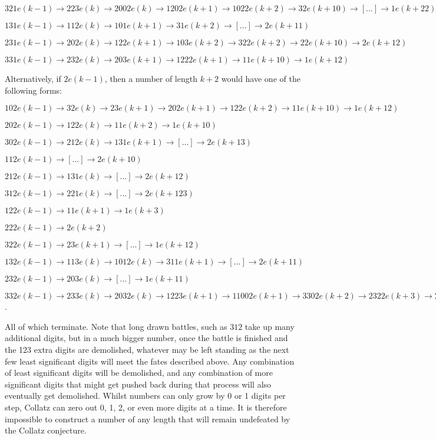 \documentclass{proc-l}
\theoremstyle{definition}
\theoremstyle{remark}
\numberwithin{equation}{section}
\begin{document}
$321e(k-1) \rightarrow 223e(k) \rightarrow 2002e(k) \rightarrow 1202e(k+1) \rightarrow 1022e(k+2) \rightarrow 32e(k+10) \rightarrow [...] \rightarrow 1e(k+22)$

$131e(k-1) \rightarrow 112e(k) \rightarrow 101e(k+1) \rightarrow 31e(k+2) \rightarrow [...] \rightarrow 2e(k+11) $

$231e(k-1) \rightarrow 202e(k) \rightarrow 122e(k+1) \rightarrow 103e(k+2) \rightarrow 322e(k+2) \rightarrow 22e(k+10) \rightarrow 2e(k+12)$

$331e(k-1) \rightarrow 232e(k) \rightarrow 203e(k+1) \rightarrow 1222e(k+1) \rightarrow 11e(k+10) \rightarrow 1e(k+12)$


Alternatively, if $2e(k-1)$, then a number of length $k+2$ would have one of the following forms:

$102e(k-1) \rightarrow 32e(k) \rightarrow 23e(k+1) \rightarrow 202e(k+1) \rightarrow 122e(k+2) \rightarrow 11e(k+10) \rightarrow 1e(k+12)$

$202e(k-1) \rightarrow 122e(k) \rightarrow 11e(k+2) \rightarrow 1e(k+10)$

$302e(k-1) \rightarrow 212e(k) \rightarrow 131e(k+1) \rightarrow [...] \rightarrow 2e(k+13)$

$112e(k-1) \rightarrow [...] \rightarrow 2e(k+10)$

$212e(k-1) \rightarrow 131e(k) \rightarrow [...] \rightarrow 2e(k+12)$

$312e(k-1) \rightarrow 221e(k) \rightarrow [...] \rightarrow 2e(k+123)$

$122e(k-1) \rightarrow 11e(k+1) \rightarrow 1e(k+3)$

$222e(k-1) \rightarrow 2e(k+2)$

$322e(k-1) \rightarrow 23e(k+1) \rightarrow [...] \rightarrow 1e(k+12)$

$132e(k-1) \rightarrow 113e(k) \rightarrow 1012e(k) \rightarrow 311e(k+1) \rightarrow [...] \rightarrow 2e(k+11)$

$232e(k-1) \rightarrow 203e(k) \rightarrow [...] \rightarrow 1e(k+11)$

$332e(k-1) \rightarrow 233e(k) \rightarrow 2032e(k) \rightarrow 1223e(k+1) \rightarrow 11002e(k+1) \rightarrow 3302e(k+2) \rightarrow 2322e(k+3) \rightarrow 202e(k+11) \rightarrow [...] \rightarrow 1e(k+21)$.

All of which terminate. 
Note that long drawn battles, such as $312$ take up many additional digits, but in a much bigger number, once the battle is finished and the 123 extra digits are demolished, whatever may be left standing as the next few least significant digits will meet the fates described above. Any combination of least significant digits will be demolished, and any combination of more significant digits that might get pushed back during that process will also eventually get demolished. Whilst numbers can only grow by 0 or 1 digits per step, Collatz can zero out 0, 1, 2, or even more digits at a time.
It is therefore impossible to construct a number of any length that will remain undefeated by the Collatz conjecture.
\end{document}

